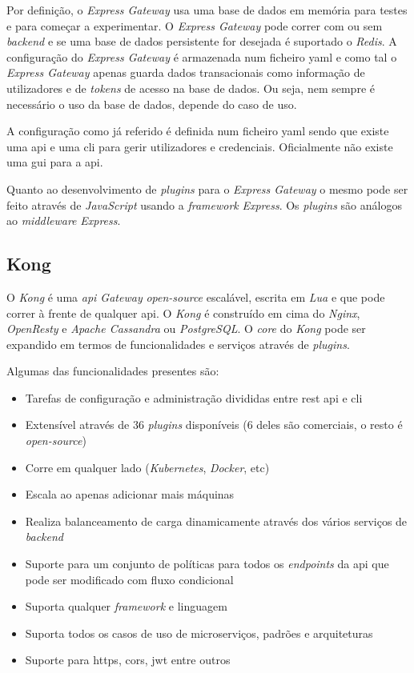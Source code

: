 Por definição, o \textit{Express Gateway} usa uma base de dados em memória para testes e para começar a experimentar. O \textit{Express Gateway} pode correr com ou sem \textit{backend} e se uma base de dados persistente for desejada é suportado o \textit{Redis}. A configuração do \textit{Express Gateway} é armazenada num ficheiro \acrshort{yaml} e como tal o \textit{Express Gateway} apenas guarda dados transacionais como informação de utilizadores e de \textit{tokens} de acesso na base de dados. Ou seja, nem sempre é necessário o uso da base de dados, depende do caso de uso.

A configuração como já referido é definida num ficheiro \acrshort{yaml} sendo que existe uma \acrshort{api} e uma \acrshort{cli} para gerir utilizadores e credenciais. Oficialmente não existe uma \acrshort{gui} para a \acrshort{api}.

Quanto ao desenvolvimento de \textit{plugins} para o \textit{Express Gateway} o mesmo pode ser feito através de \textit{JavaScript} usando a \textit{framework} \textit{Express}. Os \textit{plugins} são análogos ao \textit{middleware} \textit{Express}. 

\subsection{Kong}

O \textit{Kong} é uma \textit{\acrshort{api} Gateway} \textit{open-source} escalável, escrita em \textit{Lua} e que pode correr à frente de qualquer \acrshort{api}. O \textit{Kong} é construído em cima do \textit{Nginx}, \textit{OpenResty} e \textit{Apache Cassandra} ou \textit{PostgreSQL}. O \textit{core} do \textit{Kong} pode ser expandido em termos de funcionalidades e serviços através de \textit{plugins}.

Algumas das funcionalidades presentes são:~\cite{kong}
\begin{itemize}
    \item Tarefas de configuração e administração divididas entre \acrshort{rest} \acrshort{api} e \acrshort{cli}
    \item Extensível através de 36 \textit{plugins} disponíveis (6 deles são comerciais, o resto é \textit{open-source})
    \item Corre em qualquer lado (\textit{Kubernetes}, \textit{Docker}, etc)
    \item Escala ao apenas adicionar mais máquinas
    \item Realiza balanceamento de carga dinamicamente através dos vários serviços de \textit{backend}
    \item Suporte para um conjunto de políticas para todos os \textit{endpoints} da \acrshort{api} que pode ser modificado com fluxo condicional
    \item Suporta qualquer \textit{framework} e linguagem
    \item Suporta todos os casos de uso de microserviços, padrões e arquiteturas
    \item Suporte para \acrshort{https}, \acrshort{cors}, \acrshort{jwt} entre outros
\end{itemize}

